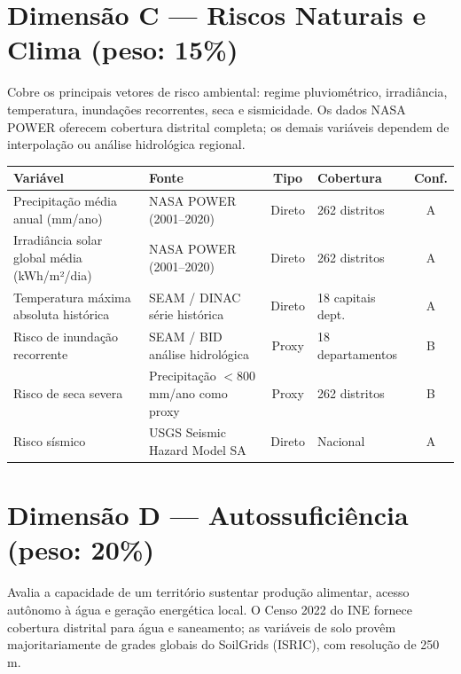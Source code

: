 \section*{Dimensão C — Riscos Naturais e Clima (peso: 15\%)}
\label{apendice:variaveis:dimC}

Cobre os principais vetores de risco ambiental: regime pluviométrico,
irradiância, temperatura, inundações recorrentes, seca e sismicidade.
Os dados NASA POWER oferecem cobertura distrital completa; os demais
variáveis dependem de interpolação ou análise hidrológica regional.

\medskip
{\small\renewcommand{\arraystretch}{1.3}
\begin{tabular}{@{}p{3.2cm} p{3.5cm} c p{2.2cm} c@{}}
\toprule
\textbf{Variável} & \textbf{Fonte} & \textbf{Tipo} & \textbf{Cobertura} & \textbf{Conf.} \\
\midrule
Precipitação média anual (mm/ano) &
  NASA POWER (2001--2020) &
  Direto &
  262 distritos &
  A \\
\midrule
Irradiância solar global média (kWh/m²/dia) &
  NASA POWER (2001--2020) &
  Direto &
  262 distritos &
  A \\
\midrule
Temperatura máxima absoluta histórica &
  SEAM / DINAC série histórica &
  Direto &
  18 capitais dept. &
  A \\
\midrule
Risco de inundação recorrente &
  SEAM / BID análise hidrológica &
  Proxy &
  18 departamentos &
  B \\
\midrule
Risco de seca severa &
  Precipitação $<$800 mm/ano como proxy &
  Proxy &
  262 distritos &
  B \\
\midrule
Risco sísmico &
  USGS Seismic Hazard Model SA &
  Direto &
  Nacional &
  A \\
\bottomrule
\end{tabular}%
}

\section*{Dimensão D — Autossuficiência (peso: 20\%)}
\label{apendice:variaveis:dimD}

Avalia a capacidade de um território sustentar produção alimentar, acesso
autônomo à água e geração energética local. O Censo 2022 do INE fornece
cobertura distrital para água e saneamento; as variáveis de solo provêm
majoritariamente de grades globais do SoilGrids (ISRIC), com resolução de
250 m.

